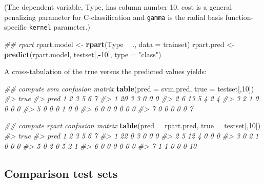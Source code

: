 \documentclass[]{book}
\newenvironment{Shaded}{\begin{snugshade}}{\end{snugshade}}
\newcommand{\CommentTok}[1]{\textcolor[rgb]{0.56,0.35,0.01}{\textit{#1}}}
\newcommand{\DataTypeTok}[1]{\textcolor[rgb]{0.13,0.29,0.53}{#1}}
\newcommand{\DecValTok}[1]{\textcolor[rgb]{0.00,0.00,0.81}{#1}}
\newcommand{\KeywordTok}[1]{\textcolor[rgb]{0.13,0.29,0.53}{\textbf{#1}}}
\newcommand{\NormalTok}[1]{#1}
\newcommand{\OperatorTok}[1]{\textcolor[rgb]{0.81,0.36,0.00}{\textbf{#1}}}
\newcommand{\StringTok}[1]{\textcolor[rgb]{0.31,0.60,0.02}{#1}}
\begin{document}
(The dependent variable, Type, has column number 10. cost is a general penalizing
parameter for C-classification and \texttt{gamma} is the radial basis function-specific
\texttt{kernel} parameter.)

\begin{Shaded}
\begin{Highlighting}[]
\CommentTok{## rpart}
\NormalTok{rpart.model <-}\StringTok{ }\KeywordTok{rpart}\NormalTok{(Type }\OperatorTok{~}\StringTok{ }\NormalTok{., }\DataTypeTok{data =}\NormalTok{ trainset)}
\NormalTok{rpart.pred <-}\StringTok{ }\KeywordTok{predict}\NormalTok{(rpart.model, testset[,}\OperatorTok{-}\DecValTok{10}\NormalTok{], }\DataTypeTok{type =} \StringTok{"class"}\NormalTok{)}
\end{Highlighting}
\end{Shaded}

A cross-tabulation of the true versus the predicted values yields:

\begin{Shaded}
\begin{Highlighting}[]
\CommentTok{## compute svm confusion matrix}
\KeywordTok{table}\NormalTok{(}\DataTypeTok{pred =}\NormalTok{ svm.pred, }\DataTypeTok{true =}\NormalTok{ testset[,}\DecValTok{10}\NormalTok{])}
\CommentTok{#>     true}
\CommentTok{#> pred  1  2  3  5  6  7}
\CommentTok{#>    1 20  3  3  0  0  0}
\CommentTok{#>    2  6 13  5  4  2  4}
\CommentTok{#>    3  2  1  0  0  0  0}
\CommentTok{#>    5  0  0  0  1  0  0}
\CommentTok{#>    6  0  0  0  0  0  0}
\CommentTok{#>    7  0  0  0  0  0  7}
\end{Highlighting}
\end{Shaded}

\begin{Shaded}
\begin{Highlighting}[]
\CommentTok{## compute rpart confusion matrix}
\KeywordTok{table}\NormalTok{(}\DataTypeTok{pred =}\NormalTok{ rpart.pred, }\DataTypeTok{true =}\NormalTok{ testset[,}\DecValTok{10}\NormalTok{])}
\CommentTok{#>     true}
\CommentTok{#> pred  1  2  3  5  6  7}
\CommentTok{#>    1 22  0  3  0  0  0}
\CommentTok{#>    2  5 12  4  0  0  0}
\CommentTok{#>    3  0  2  1  0  0  0}
\CommentTok{#>    5  0  2  0  5  2  1}
\CommentTok{#>    6  0  0  0  0  0  0}
\CommentTok{#>    7  1  1  0  0  0 10}
\end{Highlighting}
\end{Shaded}

\hypertarget{comparison-test-sets}{%
\subsection{Comparison test sets}\label{comparison-test-sets}}
\end{document}
